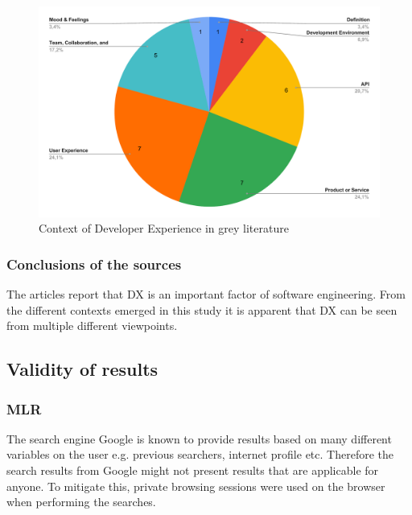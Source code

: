 \documentclass[english, 12pt, a4paper, sci, utf8, a-1b, online]{aaltothesis}
\begin{document}
\begin{figure}[ht]
  \caption{Context of Developer Experience in grey literature}
  \begin{center}
    \includegraphics[width=\textwidth]{context-grey.pdf}
  \end{center}
\end{figure}

\subsubsection{Conclusions of the sources}

The articles report that DX is an important factor of software engineering. From the different contexts emerged in this study it is apparent that DX can be seen from multiple different viewpoints.

\subsection{Validity of results}

\subsubsection{MLR}

The search engine Google is known to provide results based on many different variables on the user e.g. previous searchers, internet profile etc. Therefore the search results from Google might not present results that are applicable for anyone. To mitigate this, private browsing sessions were used on the browser when performing the searches.
\end{document}
